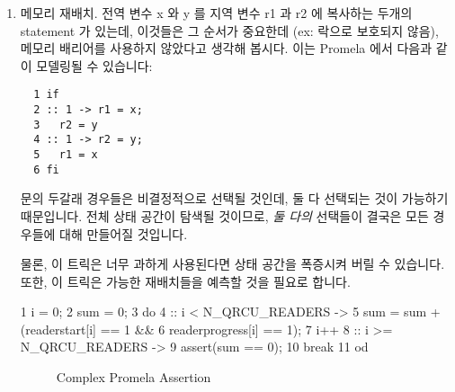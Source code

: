 \begin{enumerate}
\item	메모리 재배치.
	전역 변수 x 와 y 를 지역 변수 r1 과 r2 에 복사하는 두개의 statement 가
	있는데, 이것들은 그 순서가 중요한데 (ex: 락으로 보호되지 않음), 메모리
	배리어를 사용하지 않았다고 생각해 봅시다.
	이는 Promela 에서 다음과 같이 모델링될 수 있습니다:
\iffalse

\item	Memory reordering.  Suppose you have a pair of statements
	copying globals x and y to locals r1 and r2, where ordering
	matters (e.g., unprotected by locks), but where you have
	no memory barriers.  This can be modeled in Promela as follows:
\fi

\vspace{5pt}
\begin{minipage}[t]{\columnwidth}
\scriptsize
\begin{verbatim}
  1 if
  2 :: 1 -> r1 = x;
  3   r2 = y
  4 :: 1 -> r2 = y;
  5   r1 = x
  6 fi
\end{verbatim}
\end{minipage}
\vspace{5pt}

	 문의 두갈래 경우들은 비결정적으로 선택될 것인데, 둘 다 선택되는
	것이 가능하기 때문입니다.
	전체 상태 공간이 탐색될 것이므로, \emph{둘 다의} 선택들이 결국은 모든
	경우들에 대해 만들어질 것입니다.

	물론, 이 트릭은 너무 과하게 사용된다면 상태 공간을 폭증시켜 버릴 수
	있습니다.
	또한, 이 트릭은 가능한 재배치들을 예측할 것을 필요로 합니다.
	\iffalse

	The two branches of the \co{if} statement will be selected
	nondeterministically, since they both are available.
	Because the full state space is searched, \emph{both} choices
	will eventually be made in all cases.

	Of course, this trick will cause your state space to explode
	if used too heavily.
	In addition, it requires you to anticipate possible reorderings.
	\fi

{ \scriptsize
\begin{verbbox}
  1 i = 0;
  2 sum = 0;
  3 do
  4 :: i < N_QRCU_READERS ->
  5   sum = sum + (readerstart[i] == 1 &&
  6     readerprogress[i] == 1);
  7   i++
  8 :: i >= N_QRCU_READERS ->
  9   assert(sum == 0);
 10   break
 11 od
\end{verbbox}
}
\begin{figure}[tbp]
\centering
\theverbbox
\caption{Complex Promela Assertion}
\label{fig:analysis:Complex Promela Assertion}
\end{figure}


\end{enumerate}
